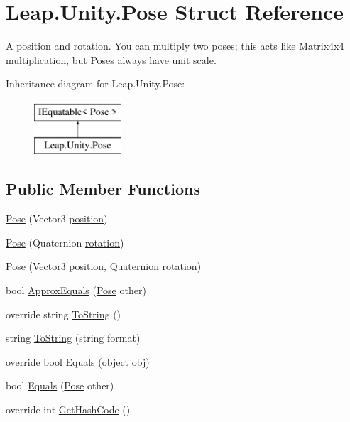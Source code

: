 \hypertarget{struct_leap_1_1_unity_1_1_pose}{}\section{Leap.\+Unity.\+Pose Struct Reference}
\label{struct_leap_1_1_unity_1_1_pose}


A position and rotation. You can multiply two poses; this acts like Matrix4x4 multiplication, but Poses always have unit scale.  


Inheritance diagram for Leap.\+Unity.\+Pose\+:\begin{figure}[H]
\begin{center}
\leavevmode
\includegraphics[height=2.000000cm]{struct_leap_1_1_unity_1_1_pose}
\end{center}
\end{figure}
\subsection*{Public Member Functions}
\begin{DoxyCompactItemize}
\item 
\mbox{\hyperlink{struct_leap_1_1_unity_1_1_pose_a5e5882a2d009bc83f987a5b82d1c4f17}{Pose}} (Vector3 \mbox{\hyperlink{struct_leap_1_1_unity_1_1_pose_ad90ba514c97484e10d747d9bdf9b81a9}{position}})
\item 
\mbox{\hyperlink{struct_leap_1_1_unity_1_1_pose_a2762b68801a572f5b4e2b3afecaa1439}{Pose}} (Quaternion \mbox{\hyperlink{struct_leap_1_1_unity_1_1_pose_a59e70598d0ebe38d79a55b88b51734ad}{rotation}})
\item 
\mbox{\hyperlink{struct_leap_1_1_unity_1_1_pose_a5443bf51e7acbf3227e577a350c910a8}{Pose}} (Vector3 \mbox{\hyperlink{struct_leap_1_1_unity_1_1_pose_ad90ba514c97484e10d747d9bdf9b81a9}{position}}, Quaternion \mbox{\hyperlink{struct_leap_1_1_unity_1_1_pose_a59e70598d0ebe38d79a55b88b51734ad}{rotation}})
\item 
bool \mbox{\hyperlink{struct_leap_1_1_unity_1_1_pose_a91aece63d4aecbb41e9af8cf2795c63a}{Approx\+Equals}} (\mbox{\hyperlink{struct_leap_1_1_unity_1_1_pose}{Pose}} other)
\item 
override string \mbox{\hyperlink{struct_leap_1_1_unity_1_1_pose_a3e16f8168410ebf2585350a36b058a65}{To\+String}} ()
\item 
string \mbox{\hyperlink{struct_leap_1_1_unity_1_1_pose_a806409523b1d9b8325e0c58d660304a7}{To\+String}} (string format)
\item 
override bool \mbox{\hyperlink{struct_leap_1_1_unity_1_1_pose_ac1e5f3546934ffb7f8935240403eb382}{Equals}} (object obj)
\item 
bool \mbox{\hyperlink{struct_leap_1_1_unity_1_1_pose_a8482a9c3754c412fd00ed41511343a12}{Equals}} (\mbox{\hyperlink{struct_leap_1_1_unity_1_1_pose}{Pose}} other)
\item 
override int \mbox{\hyperlink{struct_leap_1_1_unity_1_1_pose_a6a907351d0a69845338c3464a6658d8b}{Get\+Hash\+Code}} ()
\end{DoxyCompactItemize}
